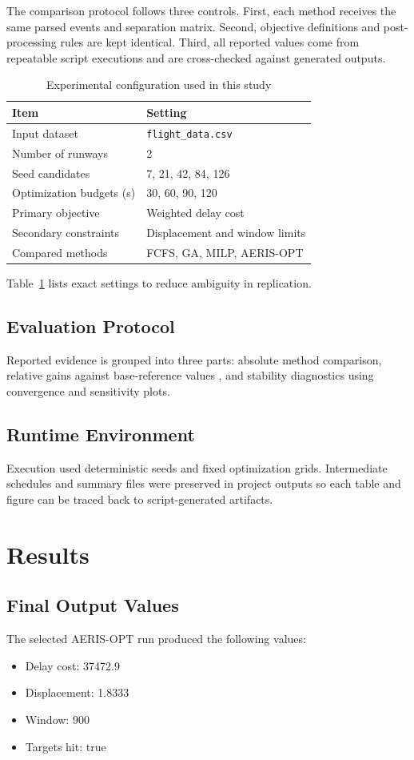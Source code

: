\documentclass[conference]{IEEEtran}
\begin{document}
The comparison protocol follows three controls. First, each method receives the same parsed events and separation matrix. Second, objective definitions and post-processing rules are kept identical. Third, all reported values come from repeatable script executions and are cross-checked against generated outputs.

\begin{table}[htbp]
\centering
\caption{Experimental configuration used in this study}
\begin{tabular}{ll}
\toprule
Item & Setting \\
\midrule
Input dataset & \texttt{flight\_data.csv} \\
Number of runways & 2 \\
Seed candidates & 7, 21, 42, 84, 126 \\
Optimization budgets (s) & 30, 60, 90, 120 \\
Primary objective & Weighted delay cost \\
Secondary constraints & Displacement and window limits \\
Compared methods & FCFS, GA, MILP, AERIS-OPT \\
\bottomrule
\end{tabular}
\label{tab:expconfig}
\end{table}

Table~\ref{tab:expconfig} lists exact settings to reduce ambiguity in replication.

\subsection{Evaluation Protocol}
Reported evidence is grouped into three parts: absolute method comparison, relative gains against base-reference values \cite{ref19}, and stability diagnostics using convergence and sensitivity plots.

\subsection{Runtime Environment}
Execution used deterministic seeds and fixed optimization grids. Intermediate schedules and summary files were preserved in project outputs so each table and figure can be traced back to script-generated artifacts.

\section{Results}
\subsection{Final Output Values}
The selected AERIS-OPT run produced the following values:
\begin{itemize}
    \item Delay cost: 37472.9
    \item Displacement: 1.8333
    \item Window: 900
    \item Targets hit: true
\end{itemize}
\end{document}
